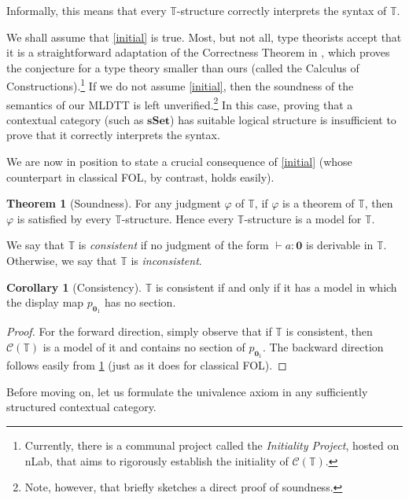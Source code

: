 \documentclass[10pt,letterpaper,cm]{nupset}
\theoremstyle{definition}
\theoremstyle{theorem}
\newtheorem{theorem}[definition]{Theorem}
\newtheorem{corollary}[definition]{Corollary}
\theoremstyle{remark}
\newcommand{\0}{\mathbf{0}}
\newcommand{\1}{\mathbf{1}}
\newcommand{\2}{\mathbf{2}}
\renewcommand{\c}{\mathscr{C}}
\newcommand{\T}{\mathbb T}
\begin{document}
Informally, this means that every $\T$-structure correctly interprets the syntax of $\T$.

\medskip

We shall assume that \cref{initial} is true. Most, but not all, type theorists accept that it is a straightforward adaptation of the Correctness Theorem in \cite{Str}, which proves the conjecture for a type theory smaller than ours (called the Calculus of Constructions).\footnote{ Currently, there is  a communal project called the \textit{Initiality Project}, hosted on nLab, that aims to rigorously establish the initiality of $\c(\T)$.    }  
 If we do not assume \cref{initial}, then the soundness of the semantics of our MLDTT is left unverified.\footnote{Note, however, that \cite[Section 3.5]{Hof} briefly sketches a direct proof of soundness.} In this case, proving that a contextual category (such as $\mathbf{sSet}$) has suitable logical structure is insufficient to prove that it correctly interprets the syntax.  

\medskip

We are now in position to state a crucial consequence of \cref{initial} (whose counterpart  in classical FOL, by contrast, holds easily).

\begin{theorem}[Soundness]\label{sound}
For  any judgment $\varphi$ of $\T$, if $\varphi$ is a theorem of $\T$, then $\varphi$ is satisfied by every $\T$-structure. Hence every $\T$-structure is a model for $\T$.
\end{theorem} 


We say that $\T$ is \textit{consistent} if no judgment of the form $\vdash a:\0$ is derivable in $\T$. Otherwise, we say that $\T$ is \textit{inconsistent}.

\begin{corollary}[Consistency]
$\T$ is consistent if and only if it has a model in which the display map $p_{\0_1}$ has no section.
\end{corollary}
\begin{proof}
For the forward direction, simply observe that if $\T$ is consistent, then $\c(\T)$ is a model of it and contains no section of $p_{\0_1}$. The backward direction follows easily from \cref{sound} (just as it does for classical FOL).
\end{proof}

\bigskip

Before moving on, let us formulate the univalence axiom in any sufficiently structured contextual category.
\end{document}
